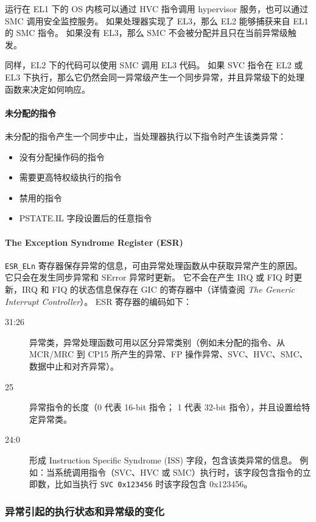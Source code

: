 运行在 EL1 下的 OS 内核可以通过 HVC 指令调用 hypervisor 服务，也可以通过 SMC 调用安全监控服务。
如果处理器实现了 EL3，那么 EL2 能够捕获来自 EL1 的 SMC 指令。
如果没有 EL3，那么 SMC 不会被分配并且只在当前异常级触发。

同样，EL2 下的代码可以使用 SMC 调用 EL3 代码。
如果 SVC 指令在 EL2 或 EL3 下执行，那么它仍然会同一异常级产生一个同步异常，并且异常级下的处理函数来决定如何响应。

\paragraph*{未分配的指令}

未分配的指令产生一个同步中止，当处理器执行以下指令时产生该类异常：

\begin{itemize}
  \item 没有分配操作码的指令
  \item 需要更高特权级执行的指令
  \item 禁用的指令
  \item PSTATE.IL 字段设置后的任意指令
\end{itemize}

\paragraph*{The Exception Syndrome Register (ESR)}

\lstinline!ESR_ELn! 寄存器保存异常的信息，可由异常处理函数从中获取异常产生的原因。
它只会在发生同步异常和 SError 异常时更新。
它不会在产生 IRQ 或 FIQ 时更新，IRQ 和 FIQ 的状态信息保存在 GIC 的寄存器中（详情查阅 \textit{The Generic Interrupt Controller}）。
ESR 寄存器的编码如下：

\begin{description}
  \item[31:26] 异常类，异常处理函数可用以区分异常类别（例如未分配的指令、从 MCR/MRC 到 CP15 所产生的异常、FP 操作异常、SVC、HVC、SMC、数据中止和对齐异常）。
  \item[25] 异常指令的长度（0 代表 16-bit 指令；
    1 代表 32-bit 指令），并且设置给特定异常类。
  \item[24:0] 形成 Instruction Specific Syndrome (ISS) 字段，包含该类异常的信息。
    例如：当系统调用指令（SVC、HVC 或 SMC）执行时，该字段包含指令的立即数，比如当执行 \lstinline!SVC 0x123456! 时该字段包含 0x123456。
\end{description}

\subsubsection{异常引起的执行状态和异常级的变化}

